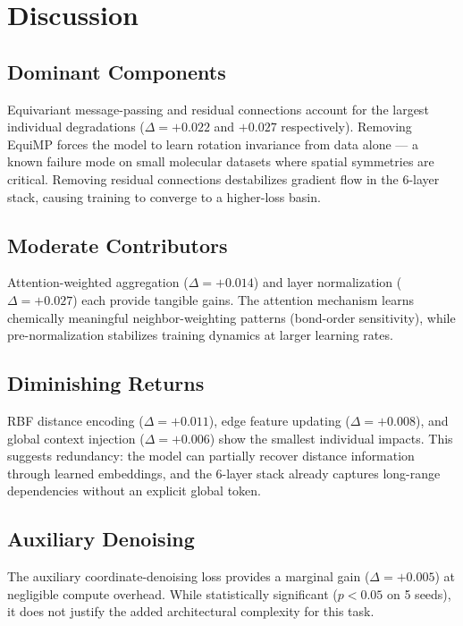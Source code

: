 \section{Discussion}

\subsection{Dominant Components}
Equivariant message-passing and residual connections account for the largest individual
degradations (\(\Delta = +0.022\) and \(+0.027\) respectively). Removing EquiMP forces
the model to learn rotation invariance from data alone --- a known failure mode on small
molecular datasets where spatial symmetries are critical. Removing residual connections
destabilizes gradient flow in the 6-layer stack, causing training to converge to a
higher-loss basin.

\subsection{Moderate Contributors}
Attention-weighted aggregation (\(\Delta = +0.014\)) and layer normalization
(\(\Delta = +0.027\)) each provide tangible gains. The attention mechanism learns
chemically meaningful neighbor-weighting patterns (bond-order sensitivity), while
pre-normalization stabilizes training dynamics at larger learning rates.

\subsection{Diminishing Returns}
RBF distance encoding (\(\Delta = +0.011\)), edge feature updating (\(\Delta = +0.008\)),
and global context injection (\(\Delta = +0.006\)) show the smallest individual impacts.
This suggests redundancy: the model can partially recover distance information through
learned embeddings, and the 6-layer stack already captures long-range dependencies
without an explicit global token.

\subsection{Auxiliary Denoising}
The auxiliary coordinate-denoising loss provides a marginal gain (\(\Delta = +0.005\))
at negligible compute overhead. While statistically significant (\(p < 0.05\) on 5
seeds), it does not justify the added architectural complexity for this task.

